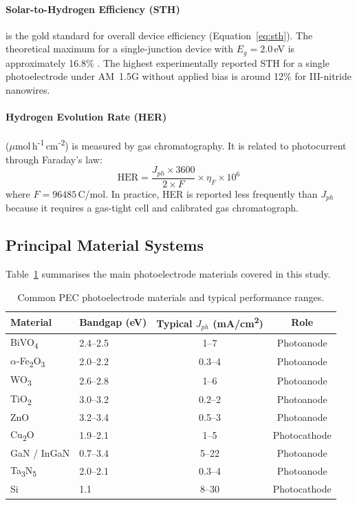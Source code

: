 \paragraph{Solar-to-Hydrogen Efficiency (STH)} is the gold standard for overall
device efficiency (Equation~\ref{eq:sth}).
The theoretical maximum for a single-junction device with $E_g = 2.0$\,eV is
approximately 16.8\% \cite{walter2010solar}.
The highest experimentally reported STH for a single photoelectrode under
AM~1.5G without applied bias is around 12\% for III-nitride nanowires.

\paragraph{Hydrogen Evolution Rate (HER)} ($\mu$mol\,h\textsuperscript{-1}\,cm\textsuperscript{-2})
is measured by gas chromatography.
It is related to photocurrent through Faraday's law:
\begin{equation}
  \text{HER} = \frac{J_{ph} \times 3600}{2 \times F} \times \eta_F \times 10^6
  \label{eq:her}
\end{equation}
where $F = 96485$\,C/mol.
In practice, HER is reported less frequently than $J_{ph}$ because it requires
a gas-tight cell and calibrated gas chromatograph.

\subsection{Principal Material Systems}

Table~\ref{tab:materials} summarises the main photoelectrode materials covered
in this study.

\begin{table}[h]
\centering
\caption{Common PEC photoelectrode materials and typical performance ranges.}
\label{tab:materials}
\begin{tabular}{llcc}
\toprule
Material & Bandgap (eV) & Typical $J_{ph}$ (mA/cm\textsuperscript{2}) & Role \\
\midrule
BiVO\textsubscript{4}       & 2.4--2.5 & 1--7   & Photoanode \\
$\alpha$-Fe\textsubscript{2}O\textsubscript{3} & 2.0--2.2 & 0.3--4 & Photoanode \\
WO\textsubscript{3}         & 2.6--2.8 & 1--6   & Photoanode \\
TiO\textsubscript{2}        & 3.0--3.2 & 0.2--2 & Photoanode \\
ZnO                         & 3.2--3.4 & 0.5--3 & Photoanode \\
Cu\textsubscript{2}O        & 1.9--2.1 & 1--5   & Photocathode \\
GaN / InGaN                 & 0.7--3.4 & 5--22  & Photoanode \\
Ta\textsubscript{3}N\textsubscript{5} & 2.0--2.1 & 0.3--4 & Photoanode \\
Si                          & 1.1     & 8--30  & Photocathode \\
\bottomrule
\end{tabular}
\end{table}

